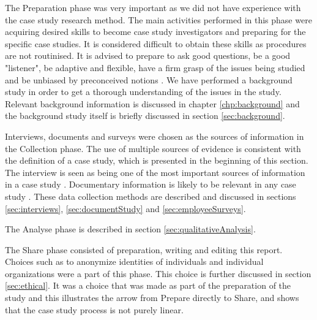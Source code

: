 The Preparation phase was very important as we did not have experience with the case study research method. The main activities performed in this phase were acquiring desired skills to become case study investigators and preparing for the specific case studies. It is considered difficult to obtain these skills as procedures are not routinised. It is advised to prepare to ask good questions, be a good "listener", be adaptive and flexible, have a firm grasp of the issues being studied and be unbiased by preconceived notions \cite{CaseStudyResearch}. We have performed a background study in order to get a thorough understanding of the issues in the study. Relevant background information is discussed in chapter \ref{chp:background} and the background study itself is briefly discussed in section \ref{sec:background}. %

Interviews, documents and surveys were chosen as the sources of information in the Collection phase. The use of multiple sources of evidence is consistent with the definition of a case study, which is presented in the beginning of this section. The interview is seen as being one of the most important sources of information in a case study \cite{CaseStudyResearch}. Documentary information is likely to be relevant in any case study \cite{CaseStudyResearch}. These data collection methods are described and discussed in sections \ref{sec:interviews}, \ref{sec:documentStudy} and \ref{sec:employeeSurveys}.

The Analyse phase is described in section \ref{sec:qualitativeAnalysis}.

The Share phase consisted of preparation, writing and editing this report. Choices such as to anonymize identities of individuals and individual organizations were a part of this phase. This choice is further discussed in section \ref{sec:ethical}. It was a choice that was made as part of the preparation of the study and this illustrates the arrow from Prepare directly to Share, and shows that the case study process is not purely linear. 